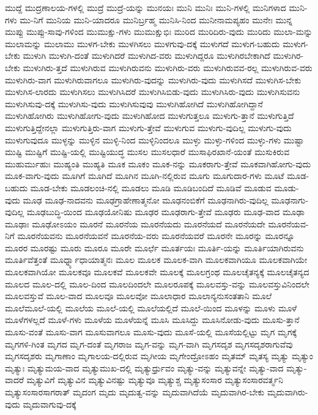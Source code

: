 {ಮುದ್ದೆ
ಮುದ್ರಣಾಲಯ-ಗಳಲ್ಲಿ
ಮುದ್ರೆ
ಮುದ್ರೆ-ಯನ್ನು
ಮುನಯಃ
ಮುನಿ
ಮುನಿಃ
ಮುನಿ-ಗಳಲ್ಲಿ
ಮುನಿಗಳಾದ
ಮುನಿ-ಗಳು
ಮು-ನಿಗೆ
ಮುನಿಯ
ಮುನಿ-ಯಾದರೂ
ಮುನಿರ್ಬ್ರಹ್ಮ
ಮುನಿಸಿ-ನಿಂದ
ಮುನೀನಾಮಪ್ಯಹಂ
ಮುನೇಃ
ಮುನ್ನ
ಮುಪ್ಪು
ಮುಪ್ಪು-ಸಾವು-ಗಳಿಂದ
ಮುಮುಕ್ಷು-ಗಳು
ಮುಮುಕ್ಷುಭಿಃ
ಮುರಿದ
ಮುರಿದಿರು-ವುದು
ಮುರಿದು
ಮುಲಾ-ಮನ್ನು
ಮುಲಾಮನ್ನು
ಮುಲಾಮು
ಮುಳಗ-ಬೇಕು
ಮುಳಗಿಸಲು
ಮುಳಗುವು-ದಕ್ಕೆ
ಮುಳುಗದೆ
ಮುಳುಗ-ಬಹುದು
ಮುಳುಗ-ಬೇಕು
ಮುಳುಗಿ
ಮುಳುಗಿ-ದಂತೆ
ಮುಳುಗಿದರೆ
ಮುಳುಗಿದ-ವರು
ಮುಳುಗಿದ್ದರೂ
ಮುಳುಗಿರಬೇಕಾಗಿದೆ
ಮುಳುಗಿರ-ಬೇಕು
ಮುಳುಗಿರು-ತ್ತದೆ
ಮುಳುಗಿರುವ
ಮುಳುಗಿರುವನು
ಮುಳುಗಿರು-ವರು
ಮುಳುಗಿರುವವ-ರಲ್ಲ
ಮುಳುಗಿರುವ-ವರು
ಮುಳುಗಿರು-ವಾಗ
ಮುಳುಗಿರುವಾಗಲೂ
ಮುಳುಗಿರು-ವುದನ್ನು
ಮುಳುಗಿರು-ವುದು
ಮುಳುಗಿಸದೆ
ಮುಳುಗಿಸ-ಬೇಕು
ಮುಳುಗಿಸ-ಲಾರದು
ಮುಳುಗಿಸಲು
ಮುಳುಗಿಸಿದರೆ
ಮುಳುಗಿಸಿಬಿಡು-ವುದು
ಮುಳುಗಿಸಿರು-ವುದು
ಮುಳುಗಿಸುವನು
ಮುಳುಗಿಸುವು-ದಕ್ಕೆ
ಮುಳುಗಿಸು-ವುದು
ಮುಳುಗಿಸುವುವು
ಮುಳುಗಿಹೋಗಿದೆ
ಮುಳುಗಿಹೋಗಿದ್ದಾನೆ
ಮುಳುಗಿಹೋಗಿರು
ಮುಳುಗಿಹೋಗು-ವುದು
ಮುಳುಗಿಹೋದ
ಮುಳುಗುತ್ತಲೂ
ಮುಳುಗು-ತ್ತಾನೆ
ಮುಳುಗುತ್ತಿದೆ
ಮುಳುಗುತ್ತಿದ್ದೇನಲ್ಲಾ
ಮುಳುಗುತ್ತಿರು-ವಾಗ
ಮುಳುಗು-ತ್ತೇವೆ
ಮುಳುಗುವ
ಮುಳುಗು-ವುದಿಲ್ಲ
ಮುಳುಗು-ವುದು
ಮುಳುಗುವುದೂ
ಮುಳ್ಳನ್ನು
ಮುಳ್ಳಿನ
ಮುಳ್ಳಿ-ನಿಂದ
ಮುಳ್ಳಿನಿಂದಲೂ
ಮುಳ್ಳು
ಮುಳ್ಳು-ಗಳಿಂದ
ಮುಳ್ಳು-ಗಳು
ಮುಷ್ಟಾ
ಮುಷ್ಟಿ
ಮುಷ್ಟಿಗೆ
ಮುಷ್ಟಿ-ಯಲ್ಲಿ
ಮುಷ್ಟಿಯುದ್ಧ
ಮುಸಲ
ಮುಸಲಧಾರೆ
ಮುಸಾಫಿರಖಾನೆ-ಯಂತೆ
ಮುಸುಕಿರುವ
ಮುಹುರ್ಮುಹುಃ
ಮುಹ್ಯಂತಿ
ಮುಹ್ಯತಿ
ಮೂಕ
ಮೂಕಂ
ಮೂಕ-ನನ್ನು
ಮೂಕರಾಗು-ತ್ತೇವೆ
ಮೂಕವಾಗಿಹೋಗು-ವುದು
ಮೂಕ-ವಾಗು-ವುದು
ಮೂಗಿಗೆ
ಮೂಗಿದೆ
ಮೂಗಿನ
ಮೂಗಿ-ನಲ್ಲಿರುವ
ಮೂಗು
ಮೂಗುದಾರ-ಗಳು
ಮೂಟೆ
ಮೂಡ-ಬಹುದು
ಮೂಡ-ಬೇಕು
ಮೂಡಲಂಚಿ-ನಲ್ಲಿ
ಮೂಡಲು
ಮೂಡಿ
ಮೂಡಿಬಂದಿದೆ
ಮೂಡಿವೆ
ಮೂಡುವ
ಮೂಡು-ವುದು
ಮೂಢ
ಮೂಢ-ನಾದವನು
ಮೂಢಗ್ರಾಹೇಣಾತ್ಮನೋ
ಮೂಢನಂಬಿಕೆಗೆ
ಮೂಢನಾಗಿರು-ವುದಿಲ್ಲ
ಮೂಢನಾಗು-ವುದಿಲ್ಲ
ಮೂಢಬುದ್ಧಿ-ಯಿಂದ
ಮೂಢಯೋನಿಷು
ಮೂಢರ
ಮೂಢರಾಗು-ತ್ತೇವೆ
ಮೂಢರು
ಮೂಢ-ವಾದ
ಮೂಢಾ
ಮೂಢಾಃ
ಮೂಢೋಽಯಂ
ಮೂರನೆ
ಮೂರನೆಯ
ಮೂರನೆಯದು
ಮೂರನೆಯದೆ
ಮೂರನೆಯದೇ
ಮೂರನೆಯವ-ನಿಗೆ
ಮೂರನೆಯವನು
ಮೂರನೆಯವನೆ
ಮೂರನೆಯ-ವರು
ಮೂರನೆಯವರೆ
ಮೂರನೇ
ಮೂರನ್ನು
ಮೂರನ್ನೂ
ಮೂರರ
ಮೂರಷ್ಟು
ಮೂರು
ಮೂರೂ
ಮೂರೇ
ಮೂರ್ಛೆ
ಮೂರ್ತಯಃ
ಮೂರ್ತಿ-ಯನ್ನು
ಮೂರ್ತಿಯಾಗಿರುವನು
ಮೂರ್ತಿವೆತ್ತಂತೆ
ಮೂರ್ಧ್ನ್ಯಾಧಾಯಾತ್ಮನಃ
ಮೂಲ
ಮೂಲಕ
ಮೂಲಕ-ವಾಗಿ
ಮೂಲಕವಾಗಿಯೂ
ಮೂಲಕವಾಗಿಯೇ
ಮೂಲಕವಾಗಿಯೋ
ಮೂಲಕವೂ
ಮೂಲಕವೆ
ಮೂಲಕವೇ
ಮೂಲಕ್ಕೆ
ಮೂಲಗ್ರಂಥ
ಮೂಲಚೈತನ್ಯಕ್ಕೆ
ಮೂಲಚೈತನ್ಯದ
ಮೂಲದ
ಮೂಲ-ದಲ್ಲಿ
ಮೂಲ-ದಿಂದ
ಮೂಲದಿಂದಲೇ
ಮೂಲರೂಪಕ್ಕೆ
ಮೂಲವಸ್ತು-ವನ್ನು
ಮೂಲವಸ್ತುವಿನಿಂದಲೇ
ಮೂಲವಸ್ತುವೆ
ಮೂಲ-ವಾದ
ಮೂಲವೂ
ಮೂಲವೋ
ಮೂಲಾಧಾರ
ಮೂಲಾನ್ಯನುಸಂತತಾನಿ
ಮೂಲೆ
ಮೂಲೆಮೂಲೆ-ಯಲ್ಲಿ
ಮೂಲೆಯ
ಮೂಲೆ-ಯಲ್ಲಿ
ಮೂಲೆಯಲ್ಲಿದೆ
ಮೂಲೆ-ಯಿಂದ
ಮೂಳನ್ನು
ಮೂಳು
ಮೂಳೆ
ಮೂಳೆಗಳಲ್ಲದೆ
ಮೂಳೆ-ಗಳು
ಮೂಳೆಯ
ಮೂಳೆಯನ್ನೆ
ಮೂಸಿ
ಮೂಸಿದ್ದು
ಮೂಸಿನೋಡು-ವುದು
ಮೂಸು-ತ್ತಾನೆ
ಮೂಸು-ವಂತೆ
ಮೂಸು-ವಾಗ
ಮೂಸುವಾಗಲೂ
ಮೂಸು-ವುದು
ಮೂಸೆ-ಯಲ್ಲಿ
ಮೂಸೆಯಲ್ಲಿಟ್ಟು
ಮೃಗ
ಮೃಗಕ್ಕೆ
ಮೃಗಗಳಿ-ಗಿಂತ
ಮೃಗದ
ಮೃಗ-ದಂತೆ
ಮೃಗರಾಜ
ಮೃಗ-ವನ್ನು
ಮೃಗ-ವಾಗಿ
ಮೃಗಸದೃಶ
ಮೃಗಸದೃಶರಾಗುವೆವು
ಮೃಗಸದೃಶರು
ಮೃಗಾಣಾಂ
ಮೃಗಾಲಯ-ದಲ್ಲಿರುವ
ಮೃಗೀಯ
ಮೃಗೇಂದ್ರೋಽಹಂ
ಮೃತಮ್
ಮೃತಸ್ಯ
ಮೃತ್ಯು
ಮೃತ್ಯುಂ
ಮೃತ್ಯುಃ
ಮೃತ್ಯುಮಯ-ವಾದ
ಮೃತ್ಯುಮುಖ-ದಲ್ಲಿ
ಮೃತ್ಯುರ್ಧ್ರುವಂ
ಮೃತ್ಯು-ವನ್ನು
ಮೃತ್ಯುವನ್ನೇ
ಮೃತ್ಯು-ವಾದ
ಮೃತ್ಯು-ವಾದರೆ
ಮೃತ್ಯುವಿಗೆ
ಮೃತ್ಯುವಿನ
ಮೃತ್ಯುವಿನಷ್ಟು
ಮೃತ್ಯುವೂ
ಮೃತ್ಯುಶ್ಚ
ಮೃತ್ಯುಸಂಸಾರ
ಮೃತ್ಯುಸಂಸಾರವರ್ತ್ಮನಿ
ಮೃತ್ಯುಸಂಸಾರಸಾಗರಾತ್
ಮೃದಂಗ
ಮೃದು
ಮೃದುತ್ವ-ವನ್ನು
ಮೃದುವಾಗಿದೆಯೆ
ಮೃದುವಾಗಿರ-ಬೇಕು
ಮೃದುವಾಗಿರು-ವುದು
ಮೃದುವಾಗುವು-ದಕ್ಕೆ
}
